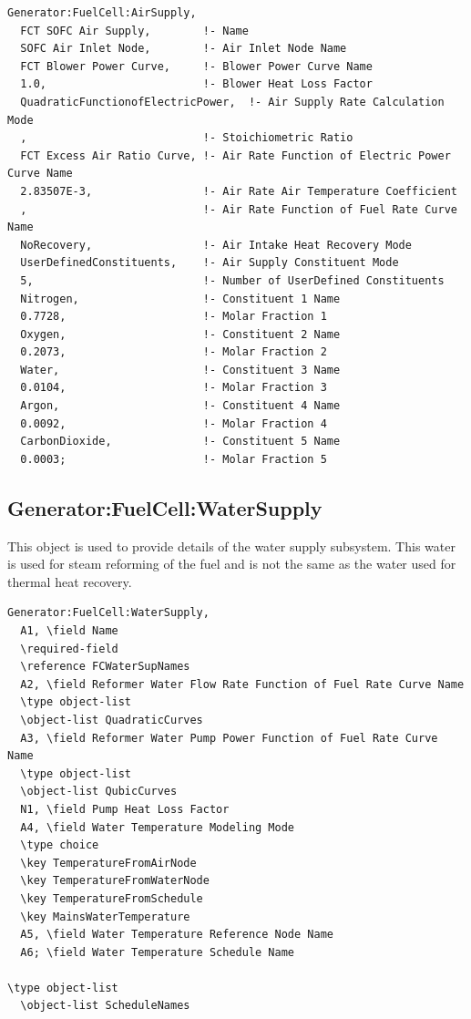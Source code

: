 \begin{lstlisting}
Generator:FuelCell:AirSupply,
  FCT SOFC Air Supply,        !- Name
  SOFC Air Inlet Node,        !- Air Inlet Node Name
  FCT Blower Power Curve,     !- Blower Power Curve Name
  1.0,                        !- Blower Heat Loss Factor
  QuadraticFunctionofElectricPower,  !- Air Supply Rate Calculation Mode
  ,                           !- Stoichiometric Ratio
  FCT Excess Air Ratio Curve, !- Air Rate Function of Electric Power Curve Name
  2.83507E-3,                 !- Air Rate Air Temperature Coefficient
  ,                           !- Air Rate Function of Fuel Rate Curve Name
  NoRecovery,                 !- Air Intake Heat Recovery Mode
  UserDefinedConstituents,    !- Air Supply Constituent Mode
  5,                          !- Number of UserDefined Constituents
  Nitrogen,                   !- Constituent 1 Name
  0.7728,                     !- Molar Fraction 1
  Oxygen,                     !- Constituent 2 Name
  0.2073,                     !- Molar Fraction 2
  Water,                      !- Constituent 3 Name
  0.0104,                     !- Molar Fraction 3
  Argon,                      !- Constituent 4 Name
  0.0092,                     !- Molar Fraction 4
  CarbonDioxide,              !- Constituent 5 Name
  0.0003;                     !- Molar Fraction 5
\end{lstlisting}

\subsection{Generator:FuelCell:WaterSupply}\label{generatorfuelcellwatersupply}

This object is used to provide details of the water supply subsystem. This water is used for steam reforming of the fuel and is not the same as the water used for thermal heat recovery.

\begin{lstlisting}
Generator:FuelCell:WaterSupply,
  A1, \field Name
  \required-field
  \reference FCWaterSupNames
  A2, \field Reformer Water Flow Rate Function of Fuel Rate Curve Name
  \type object-list
  \object-list QuadraticCurves
  A3, \field Reformer Water Pump Power Function of Fuel Rate Curve Name
  \type object-list
  \object-list QubicCurves
  N1, \field Pump Heat Loss Factor
  A4, \field Water Temperature Modeling Mode
  \type choice
  \key TemperatureFromAirNode
  \key TemperatureFromWaterNode
  \key TemperatureFromSchedule
  \key MainsWaterTemperature
  A5, \field Water Temperature Reference Node Name
  A6; \field Water Temperature Schedule Name

\type object-list
  \object-list ScheduleNames
\end{lstlisting}

